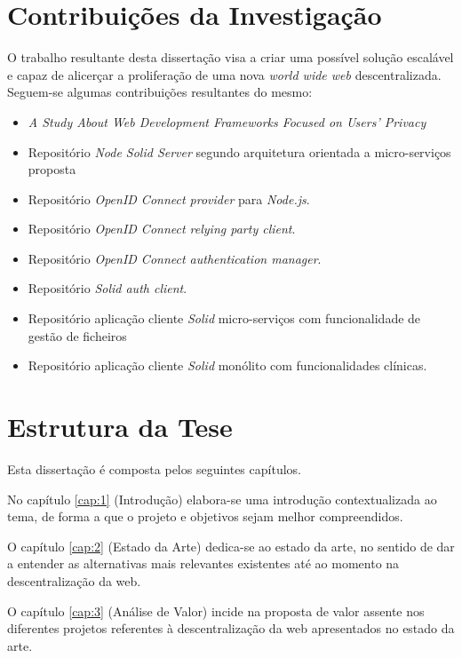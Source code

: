 \section{Contribuições da Investigação \label{section_contribuicoes_investigacao}}
O trabalho resultante desta dissertação visa a criar uma possível solução escalável e capaz de alicerçar a proliferação de uma nova \emph{world wide web} descentralizada. Seguem-se algumas contribuições resultantes do mesmo:
\begin{itemize}
    \item \emph{A Study About Web Development Frameworks Focused on Users’ Privacy}\cite{solid_article}
    \item Repositório \emph{Node Solid Server} segundo arquitetura orientada a micro-serviços proposta\cite{repo_node_solid_server}
    \item Repositório \emph{OpenID Connect provider} para \emph{Node.js}\cite{repo_oidc_op}.
    \item Repositório \emph{OpenID Connect relying party client}\cite{repo_oidc_rp}.
    \item Repositório \emph{OpenID Connect authentication manager}\cite{repo_oidc_auth_manager}.
    \item Repositório \emph{Solid auth client}\cite{repo_solid_auth_client}.
    \item Repositório aplicação cliente \emph{Solid} micro-serviços com funcionalidade de gestão de ficheiros\cite{repo_solid_filemanager}
    \item Repositório aplicação cliente \emph{Solid} monólito com funcionalidades clínicas\cite{repo_steve_clinic}.
\end{itemize}

\section{Estrutura da Tese}

Esta dissertação é composta pelos seguintes capítulos.

No capítulo \ref{cap:1} (Introdução) elabora-se uma introdução contextualizada ao tema, de forma a que o projeto e objetivos sejam melhor compreendidos.

O capítulo \ref{cap:2} (Estado da Arte) dedica-se ao estado da arte, no sentido de dar a entender as alternativas mais relevantes existentes até ao momento na descentralização da web.

O capítulo \ref{cap:3} (Análise de Valor) incide na proposta de valor assente nos diferentes projetos referentes à descentralização da web apresentados no estado da arte.

